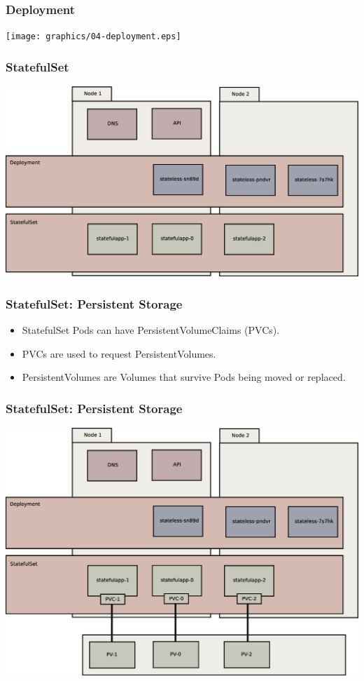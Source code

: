     \begin{frame}
        \frametitle{Deployment}
        \texttt{[image: graphics/04-deployment.eps]}
    \end{frame}

    \begin{frame}
        \frametitle{StatefulSet}
        \includegraphics[width=\textwidth,height=0.85\textheight,keepaspectratio]{graphics/05-statefulSet.eps}
    \end{frame}

    \begin{frame}
        \frametitle{StatefulSet: Persistent Storage}
        \begin{itemize}
            \item StatefulSet Pods can have PersistentVolumeClaims (PVCs).\pause
            \item PVCs are used to request PersistentVolumes.\pause
            \item PersistentVolumes are Volumes that survive Pods being moved or replaced.
        \end{itemize}
    \end{frame}

    \begin{frame}
        \frametitle{StatefulSet: Persistent Storage}
        \includegraphics[width=\textwidth,height=0.85\textheight,keepaspectratio]{graphics/06-persistence.eps}
    \end{frame}

